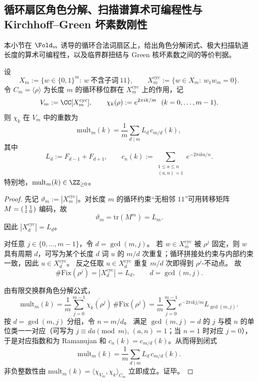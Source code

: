 \subsection{循环扇区角色分解、扫描谱算术可编程性与 Kirchhoff--Green 坏素数刚性}\label{subsec:conclusion-cyclic-sector-scan-spectrum-kirchhoff-green-bad-prime-rigidity}
本小节在 \(\Fold_m\) 诱导的循环合法词扇区上，给出角色分解闭式、极大扫描轨道长度的算术可编程性，以及临界群扭结与 Green 核坏素数之间的等价判据。

\begin{theorem}\label{thm:conclusion-cyclic-zeckendorf-sector-character-closed-form}
设
\[
X_m:=\{w\in\{0,1\}^m:\ w\ \text{不含子词}\ 11\},
\qquad
X_m^{\mathrm{cyc}}:=\{w\in X_m:\ w_1w_m=0\}.
\]
令 \(C_m=\langle\rho\rangle\) 为长度 \(m\) 的循环移位群在 \(X_m^{\mathrm{cyc}}\) 上的作用，记
\[
V_m:=\CC[X_m^{\mathrm{cyc}}],
\qquad
\chi_k(\rho):=e^{2\pi i k/m}\ \ (k=0,\dots,m-1).
\]
则 \(\chi_k\) 在 \(V_m\) 中的重数为
\[
\mathrm{mult}_m(k)
=\frac1m\sum_{d\mid m}L_d\,c_{m/d}(k),
\]
其中
\[
L_d:=F_{d-1}+F_{d+1},
\qquad
c_n(k):=\sum_{\substack{1\le a\le n\\(a,n)=1}}e^{-2\pi i ka/n}.
\]
特别地，\(\mathrm{mult}_m(k)\in\ZZ_{\ge 0}\)。
\end{theorem}
\begin{proof}
先记 \(\vartheta_m:=|X_m^{\mathrm{cyc}}|\)。对长度 \(m\) 的循环约束“无相邻 \(11\)”可用转移矩阵
\(
M=\begin{psmallmatrix}1&1\\ 1&0\end{psmallmatrix}
\)
编码，故
\[
\vartheta_m=\mathrm{tr}(M^m)=L_m.
\]
因此 \(|X_d^{\mathrm{cyc}}|=L_d\)。

对任意 \(j\in\{0,\dots,m-1\}\)，令 \(d=\gcd(m,j)\)。
若 \(w\in X_m^{\mathrm{cyc}}\) 被 \(\rho^j\) 固定，则 \(w\) 具有周期 \(d\)，可写为某个长度 \(d\) 词 \(u\) 的 \(m/d\) 次重复；循环拼接处约束与内部约束一致，因此 \(u\in X_d^{\mathrm{cyc}}\)。
反之任取 \(u\in X_d^{\mathrm{cyc}}\) 重复 \(m/d\) 次即得到 \(\rho^j\)-不动点。
故
\[
\#\mathrm{Fix}(\rho^j)=|X_d^{\mathrm{cyc}}|=L_d,\qquad d=\gcd(m,j).
\]

由有限交换群角色分解公式，
\[
\mathrm{mult}_m(k)
=\frac1m\sum_{j=0}^{m-1}\overline{\chi_k(\rho^j)}\,\#\mathrm{Fix}(\rho^j)
=\frac1m\sum_{j=0}^{m-1}e^{-2\pi i kj/m}L_{\gcd(m,j)}.
\]
按 \(d=\gcd(m,j)\) 分组，令 \(n=m/d\)。
满足 \(\gcd(m,j)=d\) 的 \(j\) 与模 \(n\) 的单位类一一对应（可写为 \(j\equiv da\pmod m\), \((a,n)=1\)；当 \(n=1\) 时对应 \(j=0\)），
于是对应指数和为 Ramanujan 和 \(c_n(k)=c_{m/d}(k)\)。从而得到闭式
\[
\mathrm{mult}_m(k)=\frac1m\sum_{d\mid m}L_d\,c_{m/d}(k).
\]
非负整数性由 \(\mathrm{mult}_m(k)=\langle\chi_{V_m},\chi_k\rangle_{C_m}\) 立即成立。证毕。
\end{proof}

